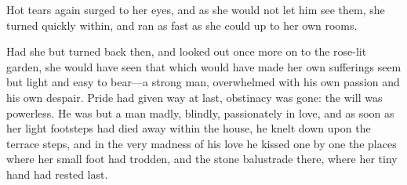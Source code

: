 Hot tears again surged to her eyes, and as she would not let him see them, she turned quickly within, and ran as fast as she could up to her own rooms.

Had she but turned back then, and looked out once more on to the rose-lit garden, she would have seen that which would have made her own sufferings seem but light and easy to bear---a strong man, overwhelmed with his own passion and his own despair. Pride had given way at last, obstinacy was gone: the will was powerless. He was but a man madly, blindly, passionately in love, and as soon as her light footsteps had died away within the house, he knelt down upon the terrace steps, and in the very madness of his love he kissed one by one the places where her small foot had trodden, and the stone balustrade there, where her tiny hand had rested last.